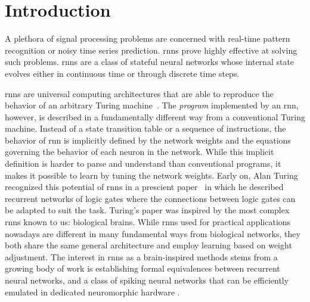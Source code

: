\documentclass[journal,onecolumn,11pt]{IEEEtran}
\begin{document}
\section{Introduction}
A plethora of signal processing problems are concerned with real-time pattern recognition or noisy time series prediction.
\glspl{rnn} prove highly effective \cite{Goodfellow_etal16_deeplear} at solving such problems. 
\glspl{rnn} are a class of stateful neural networks whose internal state evolves either in continuous time or through discrete time steps.

\glspl{rnn} are universal computing architectures that are able to reproduce the behavior of an arbitrary Turing machine~\cite{Siegelmann_Sontag95}.
The {\it program} implemented by an \gls{rnn}, however, is described in a fundamentally different way from a conventional Turing machine.
Instead of a state transition table or a sequence of instructions, the behavior of \gls{rnn} is implicitly defined by the network weights and the equations governing the behavior of each neuron in the network.
While this implicit definition is harder to parse and understand than conventional programs, it makes it possible to learn by tuning the network weights.
%
Early on, Alan Turing recognized this potential of \glspl{rnn} in a prescient paper~\cite{Ince92} in which he described recurrent networks of logic gates where the connections between logic gates can be adapted to suit the task.
Turing's paper was inspired by the most complex \glspl{rnn} known to us: biological brains.
While \glspl{rnn} used for practical applications nowadays are different in many fundamental ways from biological networks, they both share the same general architecture and employ learning based on weight adjustment.
%
The interest in \glspl{rnn} as a brain-inspired methods stems from a growing body of work is establishing formal equivalences between recurrent neural networks, and a class of spiking neural networks that can be efficiently emulated in dedicated neuromorphic hardware \cite{Zenke_Ganguli17_supesupe,Wozniak_etal18_deepnetw,Neftci18_datapowe,Bellec_etal18_longshor}. 
\end{document}

